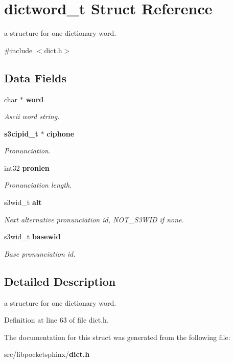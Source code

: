 \section{dictword\+\_\+t Struct Reference}
\label{structdictword__t}


a structure for one dictionary word.  




{\ttfamily \#include $<$dict.\+h$>$}

\subsection*{Data Fields}
\begin{DoxyCompactItemize}
\item 
char $\ast$ {\bf word}\label{structdictword__t_a3f3371918a406e26817bd4f2cecd7329}

\begin{DoxyCompactList}\small\item\em Ascii word string. \end{DoxyCompactList}\item 
{\bf s3cipid\+\_\+t} $\ast$ {\bf ciphone}\label{structdictword__t_acf5836b5a681485868e9090ad67366d5}

\begin{DoxyCompactList}\small\item\em Pronunciation. \end{DoxyCompactList}\item 
int32 {\bf pronlen}\label{structdictword__t_a50509f28a4b64d76519bfadea12f0fa0}

\begin{DoxyCompactList}\small\item\em Pronunciation length. \end{DoxyCompactList}\item 
s3wid\+\_\+t {\bf alt}\label{structdictword__t_a84b63cd03706221645f46b2da09e9540}

\begin{DoxyCompactList}\small\item\em Next alternative pronunciation id, N\+O\+T\+\_\+\+S3\+W\+I\+D if none. \end{DoxyCompactList}\item 
s3wid\+\_\+t {\bf basewid}\label{structdictword__t_a53dd72f96a9de21d8925e246cc7c036f}

\begin{DoxyCompactList}\small\item\em Base pronunciation id. \end{DoxyCompactList}\end{DoxyCompactItemize}


\subsection{Detailed Description}
a structure for one dictionary word. 

Definition at line 63 of file dict.\+h.



The documentation for this struct was generated from the following file\+:\begin{DoxyCompactItemize}
\item 
src/libpocketsphinx/{\bf dict.\+h}\end{DoxyCompactItemize}
